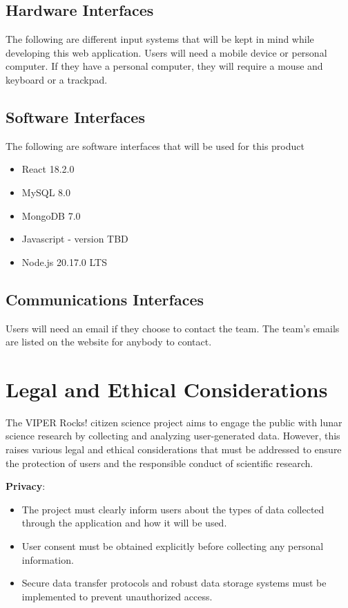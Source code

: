 \documentclass{article}
\begin{document}
\subsection{Hardware Interfaces}
The following are different input systems that will be kept in mind while developing this web application. Users will need a mobile device or personal computer. If they have a personal computer, they will require a mouse and keyboard or a trackpad.
\subsection{Software Interfaces}
The following are software interfaces that will be used for this product
\begin{itemize}
	\item React 18.2.0
	\item MySQL 8.0
	\item MongoDB 7.0
	\item Javascript - version TBD
	\item Node.js 20.17.0 LTS
\end{itemize}
\subsection{Communications Interfaces}
Users will need an email if they choose to contact the team. The team’s emails are listed on the website for anybody to contact.

\section{Legal and Ethical Considerations}
The VIPER Rocks! citizen science project aims to engage the public with lunar science research by collecting and analyzing user-generated data. However, this raises various legal and ethical considerations that must be addressed to ensure the protection of users and the responsible conduct of scientific research.

\textbf{Privacy}:
\begin{itemize}
	\item The project must clearly inform users about the types of data collected through the application and how it will be used.
	\item User consent must be obtained explicitly before collecting any personal information.
	\item Secure data transfer protocols and robust data storage systems must be implemented to prevent unauthorized access.
\end{itemize}
\end{document}
